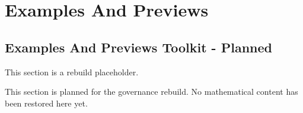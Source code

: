 \section{Examples And Previews}

\subsection*{Examples And Previews Toolkit - Planned}

\begin{exposition}
This section is a rebuild placeholder.
\end{exposition}

\begin{exposition}
This section is planned for the governance rebuild. No mathematical content has
been restored here yet.
\end{exposition}
